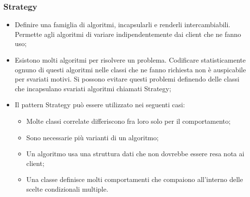 \subsubsection{Strategy} 
\begin{itemize}
\item {} Definire una famiglia di algoritmi, incapsularli e renderli intercambiabili. Permette agli algoritmi di variare indipendentemente dai client che ne fanno uso;
\item {} Esistono molti algoritmi per risolvere un problema. Codificare statisticamente ognuno di questi algoritmi nelle classi che ne fanno richiesta non è auspicabile per svariati motivi. Si possono evitare questi problemi definendo delle classi che incapsulano svariati algoritmi chiamati Strategy; 
\item {} Il pattern Strategy può essere utilizzato nei seguenti casi:
\begin{itemize}
\item Molte classi correlate differiscono fra loro solo per il comportamento;
\item Sono necessarie più varianti di un algoritmo;
\item Un algoritmo usa una struttura dati che non dovrebbe essere resa nota ai client;
\item Una classe definisce molti comportamenti che compaiono all'interno delle scelte condizionali multiple.
\end{itemize}
\end{itemize}



